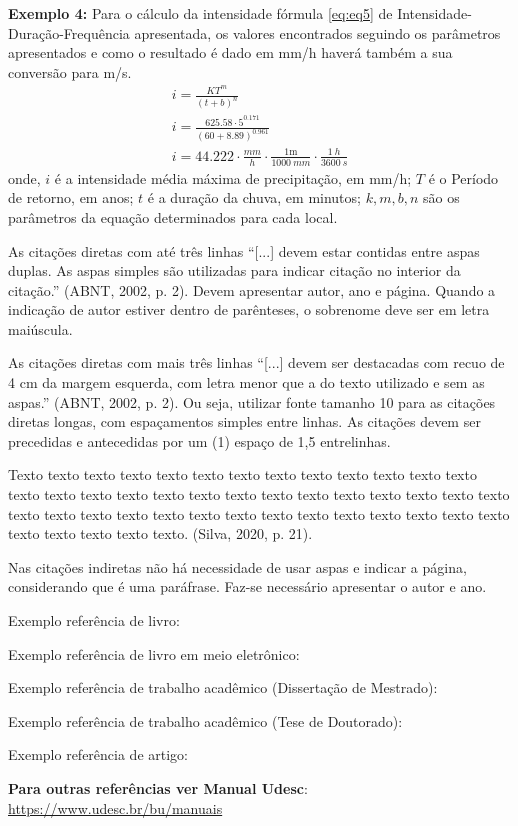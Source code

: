 \textbf{Exemplo 4:}
Para o cálculo da intensidade fórmula \eqref{eq:eq5} de Intensidade-Duração-Frequência apresentada, os valores encontrados seguindo os parâmetros apresentados e como o resultado é dado em mm/h haverá também a sua conversão para m/s.
\begin{gather} 
	i = \frac{K T^m}{(t+b)^n}   \label{eq:eq5}  \\[2ex]
		i = \frac{\num{625.58} \cdot 5^{\num{0.171}}  }{(60+\num{8.89})^{\num{0.961}}} \\[2ex]
		i = \num{44.222} \cdot \frac{\si{mm}}{\si{h}} \cdot \frac{1\mathrm{m}}{\SI{1000}{mm}} \cdot \frac{\SI{1}{h}}{\SI{3600}{s}} 	
\end{gather}
\noindent onde, $i$ é a intensidade média máxima de precipitação, em mm/h; $T$ é o Período de retorno, em anos; $t$ é a duração da chuva, em minutos; $k,m,b,n$ são os parâmetros da equação determinados para cada local.


As citações diretas com até três linhas ``[...] devem estar contidas entre aspas duplas. As aspas simples são utilizadas para indicar citação no interior da citação.'' (ABNT, 2002, p. 2). Devem apresentar autor, ano e página. Quando a indicação de autor estiver dentro de parênteses, o sobrenome deve ser em letra maiúscula. 


As citações diretas com mais três linhas ``[...] devem ser destacadas com recuo de 4 cm da margem esquerda, com letra menor que a do texto utilizado e sem as aspas.'' (ABNT, 2002, p. 2). Ou seja, utilizar fonte tamanho 10 para as citações diretas longas, com espaçamentos simples entre linhas. As citações devem ser precedidas e antecedidas por um (1) espaço de 1,5 entrelinhas. 

\begin{citacao}
Texto texto texto texto texto texto texto texto texto texto texto texto texto texto texto texto texto texto texto texto texto texto texto texto texto texto texto texto texto texto texto texto texto texto texto texto texto texto texto texto texto texto texto texto texto texto. (Silva, 2020, p. 21).
\end{citacao}


Nas citações indiretas não há necessidade de usar aspas e indicar a página, considerando que é uma paráfrase. Faz-se necessário apresentar o autor e ano.






\noindent Exemplo referência de livro: \cite{exemplo_livro}

\noindent Exemplo referência de livro em meio eletrônico: \cite{exemplo_livroe}

\noindent Exemplo referência de trabalho acadêmico (Dissertação de Mestrado): \cite{exemplo_dissertacao}

\noindent Exemplo referência de trabalho acadêmico (Tese de Doutorado): \cite{exemplo_tese}

\noindent Exemplo referência de artigo: \cite{exemplo_artigo}


\textbf{Para outras referências ver Manual Udesc}: \url{https://www.udesc.br/bu/manuais}








